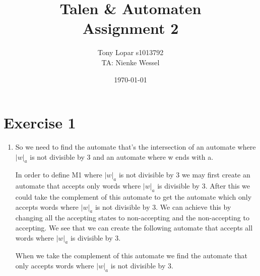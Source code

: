 \documentclass{article}
\begin{document}
\title{Talen \& Automaten \\ Assignment 2}
\date{\today}
\author{Tony Lopar \enspace s1013792 \\TA: Nienke Wessel}
\maketitle

\section*{Exercise 1}
\begin{enumerate}[label=\alph*)]
  \item So we need to find the automate that's the intersection of an automate where $|w|_a$ is not divisible by 3 and an automate where w ends with a.

In order to define M1 where $|w|_a$ is not divisible by 3 we may first create an automate that accepts only words where $|w|_a$ is divisible by 3. After this we could take the complement of this automate to get the automate which only accepts words where $|w|_a$ is not divisible by 3. We can achieve this by changing all the accepting states to non-accepting and the non-accepting to accepting. We see that we can create the following automate that accepts all words where $|w|_a$ is divisible by 3.  \\
\begin{center}
\end{center}

When we take the complement of this automate we find the automate that only accepts words where $|w|_a$ is not divisible by 3. \\
\begin{center}
\end{center}


\end{enumerate}
\end{document}
